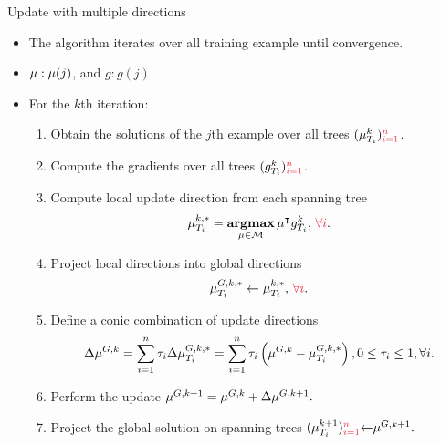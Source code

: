 \documentclass[first=dgreen,second=purple,logo=yellowexc]{aaltoslides}
\begin{document}
\begin{frame}{Update with multiple directions}
	\begin{itemize}\footnotesize
		\item The algorithm iterates over all training example until convergence.
		\item $\mathbf {\mu}:\mathbf {\mu}(j)$, and $g:g(j)$.
		\item For the $k$th iteration:
		\begin{enumerate}\footnotesize
			\item Obtain the solutions of the $j$th example over all trees $(\vmu_{T_i}^k){\color{aaltored}_{i=1}^n}$.
			\item Compute the gradients over all trees $(g_{T_i}^k){\color{aaltored}_{i=1}^n}$.
			\item Compute local update direction from each spanning tree
			\begin{align*}
				{\vmu}_{T_i}^{k,*} = \underset{\vmu\in\Mcal}{\argmax}\,\vmu\tp g_{T_i}^k,\,{\color{aaltored}\forall i}.
			\end{align*}
			\item Project local directions into global directions
			\begin{align*}
				{\vmu}_{T_i}^{G,k,*} \leftarrow {\vmu}_{T_i}^{k,*},\,{\color{aaltored}\forall i}.
			\end{align*}
			\item Define a conic combination of update directions 
			\begin{align*}
				\Delta{\mathbf {\mu}}^{G,k} = \sum_{i=1}^{n}\tau_i \Delta{\mathbf {\mu}}_{T_i}^{G,k,*} = \sum_{i=1}^{n}\tau_i \left({\mathbf {\mu}}^{G,k} -{\mathbf {\mu}}_{T_i}^{G,k,*}\right), 0\le\tau_i\le1,\forall i.
			\end{align*}
			\item Perform the update $\mathbf {\mu}^{G,k+1} = \mathbf {\mu}^{G,k} + \Delta{\mathbf {\mu}}^{G,k+1}.$
			\item Project the global solution on spanning trees $(\vmu_{T_i}^{k+1}){\color{aaltored}_{i=1}^{n}}{\leftarrow}\vmu^{G,k+1}.$
		\end{enumerate}
	\end{itemize}
\end{frame}
\end{document}
